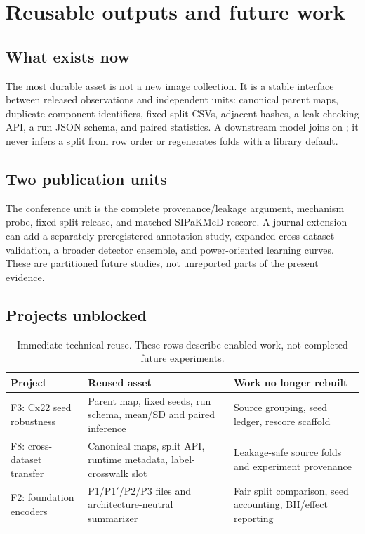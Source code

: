 \chapter{Reusable outputs and future work}\label{s1:ch:ch17_reusable_outputs_and_future_work}

\section{What exists now}

The most durable asset is not a new image collection. It is a stable interface between released observations and independent units: canonical parent maps, duplicate-component identifiers, fixed split CSVs, adjacent hashes, a leak-checking API, a run JSON schema, and paired statistics. A downstream model joins on ; it never infers a split from row order or regenerates folds with a library default.

\section{Two publication units}

The conference unit is the complete provenance/leakage argument, mechanism probe, fixed split release, and matched SIPaKMeD rescore. A journal extension can add a separately preregistered annotation study, expanded cross-dataset validation, a broader detector ensemble, and power-oriented learning curves. These are partitioned future studies, not unreported parts of the present evidence.

\section{Projects unblocked}

\begin{table}[H]
\centering
\caption{Immediate technical reuse. These rows describe enabled work, not completed future experiments.}
\label{s1:tab:reuse}
\begin{tabularx}{\textwidth}{lXX}
\toprule
Project & Reused asset & Work no longer rebuilt \\
\midrule
F3: Cx22 seed robustness & Parent map, fixed seeds, run schema, mean/SD and paired inference & Source grouping, seed ledger, rescore scaffold \\
F8: cross-dataset transfer & Canonical maps, split API, runtime metadata, label-crosswalk slot & Leakage-safe source folds and experiment provenance \\
F2: foundation encoders & P1/P1$'$/P2/P3 files and architecture-neutral summarizer & Fair split comparison, seed accounting, BH/effect reporting \\
\bottomrule
\end{tabularx}
\end{table}

